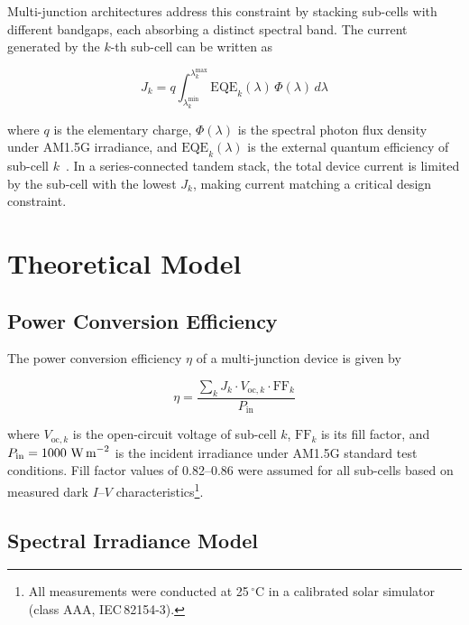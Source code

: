 \documentclass[10pt,twocolumn]{article}
\begin{document}
Multi-junction architectures address this constraint by stacking sub-cells with different
bandgaps, each absorbing a distinct spectral band. The current generated by the $k$-th
sub-cell can be written as

\begin{equation}
  J_k = q \int_{\lambda_k^{\min}}^{\lambda_k^{\max}} \text{EQE}_k(\lambda)\,
        \Phi(\lambda)\, d\lambda
  \label{eq:subcell_current}
\end{equation}

\noindent
where $q$ is the elementary charge, $\Phi(\lambda)$ is the spectral photon flux density
under AM1.5G irradiance, and $\text{EQE}_k(\lambda)$ is the external quantum efficiency
of sub-cell $k$~\cite{wakabayashi2019}. In a series-connected tandem stack, the total device current is limited
by the sub-cell with the lowest $J_k$, making current matching a critical design constraint.

\section{Theoretical Model}

\subsection{Power Conversion Efficiency}

The power conversion efficiency $\eta$ of a multi-junction device is given by

\begin{equation}
  \eta = \frac{\sum_{k} J_k \cdot V_{\text{oc},k} \cdot \text{FF}_k}{P_{\text{in}}}
  \label{eq:pce}
\end{equation}

\noindent
where $V_{\text{oc},k}$ is the open-circuit voltage of sub-cell $k$, $\text{FF}_k$ is its
fill factor, and $P_{\text{in}} = 1000\ \text{W\,m}^{-2}$ is the incident irradiance under
AM1.5G standard test conditions. Fill factor values of 0.82--0.86 were assumed for all
sub-cells based on measured dark $I$--$V$ characteristics\footnote{All measurements were
conducted at 25\,$^\circ$C in a calibrated solar simulator (class AAA, IEC\,82154-3).}.

\subsection{Spectral Irradiance Model}
\end{document}
